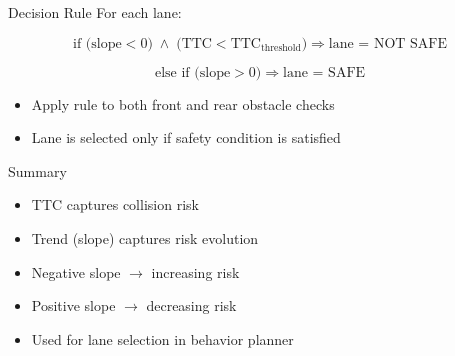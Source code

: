 \documentclass[aspectratio=169]{beamer}
\begin{document}
\begin{frame}{Decision Rule}
For each lane:

\[
\text{if }
\bigl(\mathrm{slope} < 0\bigr)
\;\land\;
\bigl(\mathrm{TTC} < \mathrm{TTC}_{\mathrm{threshold}}\bigr)
\Rightarrow
\text{lane = NOT SAFE}
\]

\[
\text{else if }
\bigl(\mathrm{slope} > 0\bigr)
\Rightarrow
\text{lane = SAFE}
\]

\begin{itemize}
    \item Apply rule to both front and rear obstacle checks
    \item Lane is selected only if safety condition is satisfied
\end{itemize}
\end{frame}

\begin{frame}{Summary}
\begin{itemize}
    \item TTC captures collision risk
    \item Trend (slope) captures risk evolution
    \item Negative slope $\rightarrow$ increasing risk
    \item Positive slope $\rightarrow$ decreasing risk
    \item Used for lane selection in behavior planner
\end{itemize}
\end{frame}
\end{document}
